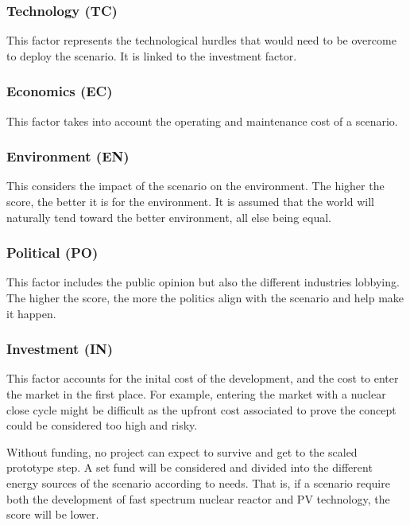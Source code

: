 \documentclass[IJPHM, 2017, 29]{PHMSociety}
\begin{document}
\subsubsection{Technology (TC)}

This factor represents the technological hurdles that would need to be overcome to deploy the scenario. It is linked to the investment factor.

\subsubsection{Economics (EC)}

This factor takes into account the operating and maintenance cost of a scenario.

\subsubsection{Environment (EN)}

This considers the impact of the scenario on the environment. The higher the score, the better it is for the environment. It is assumed that the world will naturally tend toward the better environment, all else being equal.

\subsubsection{Political (PO)}

This factor includes the public opinion but also the different industries lobbying. The higher the score, the more the politics align with the scenario and help make it happen.


\subsubsection{Investment (IN)}

This factor accounts for the inital cost of the development, and the cost to enter the market in the first place. For example, entering the market with a nuclear close cycle might be difficult as the upfront cost associated to prove the concept could be considered too high and risky.

Without funding, no project can expect to survive and get to the scaled prototype step. A set fund will be considered and divided into the different energy sources of the scenario according to needs. That is, if a scenario require both the development of fast spectrum nuclear reactor and PV technology, the score will be lower.
\end{document}
